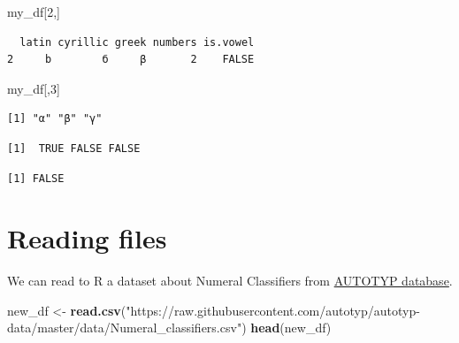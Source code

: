 \documentclass[]{book}
\newenvironment{Shaded}{\begin{snugshade}}{\end{snugshade}}
\newcommand{\KeywordTok}[1]{\textcolor[rgb]{0.13,0.29,0.53}{\textbf{#1}}}
\newcommand{\DecValTok}[1]{\textcolor[rgb]{0.00,0.00,0.81}{#1}}
\newcommand{\StringTok}[1]{\textcolor[rgb]{0.31,0.60,0.02}{#1}}
\newcommand{\OperatorTok}[1]{\textcolor[rgb]{0.81,0.36,0.00}{\textbf{#1}}}
\newcommand{\NormalTok}[1]{#1}
\theoremstyle{definition}
\theoremstyle{definition}
\theoremstyle{definition}
\theoremstyle{remark}
\begin{document}
\begin{Shaded}
\begin{Highlighting}[]
\NormalTok{my_df[}\DecValTok{2}\NormalTok{,]}
\end{Highlighting}
\end{Shaded}

\begin{verbatim}
  latin cyrillic greek numbers is.vowel
2     b        б     β       2    FALSE
\end{verbatim}

\begin{Shaded}
\begin{Highlighting}[]
\NormalTok{my_df[,}\DecValTok{3}\NormalTok{]}
\end{Highlighting}
\end{Shaded}

\begin{verbatim}
[1] "α" "β" "γ"
\end{verbatim}

\begin{Shaded}
\end{Shaded}

\begin{verbatim}
[1]  TRUE FALSE FALSE
\end{verbatim}

\begin{Shaded}
\end{Shaded}

\begin{verbatim}
[1] FALSE
\end{verbatim}

\section{Reading files}\label{reading-files}

We can read to R a dataset about Numeral Classifiers from
\href{https://github.com/autotyp/autotyp-data}{AUTOTYP database}.

\begin{Shaded}
\begin{Highlighting}[]
\NormalTok{new_df <-}\StringTok{ }\KeywordTok{read.csv}\NormalTok{(}\StringTok{"https://raw.githubusercontent.com/autotyp/autotyp-data/master/data/Numeral_classifiers.csv"}\NormalTok{)}
\KeywordTok{head}\NormalTok{(new_df)}
\end{Highlighting}
\end{Shaded}
\end{document}
